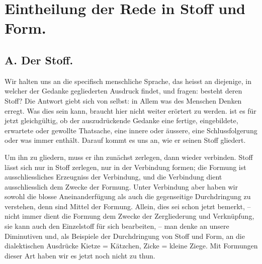 
\section*{Eintheilung der Rede in Stoff und Form.}
\subsection*{}
\subsection*{A. Der Stoff.}

Wir halten uns  an die specifisch menschliche Sprache, das heisst an diejenige, in welcher der Gedanke gegliederten Ausdruck findet, und fragen:  besteht deren Stoff? Die Antwort giebt sich von selbst: in Allem was des Menschen Denken erregt. Was  dies sein kann, braucht hier nicht weiter erörtert zu werden.  ist es für jetzt gleichgültig, ob der auszudrückende Gedanke eine fertige, eingebildete, erwartete oder gewollte Thatsache, eine innere oder äussere, eine Schlussfolgerung oder was immer enthält. Darauf kommt es uns an, wie er seinen Stoff gliedert.

Um ihn zu gliedern, muss er ihn zunächst zerlegen, dann wieder verbinden. Stoff lässt sich nur in Stoff zerlegen, nur in der Verbindung formen; die Formung ist ausschliessliches Erzeugniss der Verbindung, und die Verbindung dient ausschliesslich dem Zwecke der Formung. Unter Verbindung aber haben wir sowohl die blosse Aneinanderfügung als auch die gegenseitige Durchdringung zu verstehen, denn  sind Mittel der \label{fp.186} Formung. Allein, dies sei schon jetzt bemerkt, – nicht immer dient die Formung dem Zwecke der Zergliederung und Verknüpfung, sie kann auch den Einzelstoff für sich bearbeiten, – man denke an unsere Diminutiven und, als Beispiele der Durchdringung von Stoff und Form, an die dialektischen Ausdrücke Kietze = Kätzchen, Zicke = kleine Ziege. Mit Formungen dieser Art haben wir es jetzt noch nicht zu thun.


